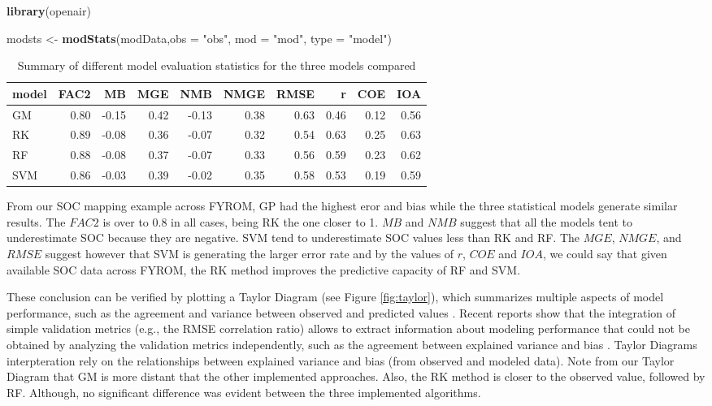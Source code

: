 \documentclass[10pt,b5paper,]{book}
\newenvironment{Shaded}{\begin{snugshade}}{\end{snugshade}}
\newcommand{\DataTypeTok}[1]{\textcolor[rgb]{0.13,0.29,0.53}{#1}}
\newcommand{\KeywordTok}[1]{\textcolor[rgb]{0.13,0.29,0.53}{\textbf{#1}}}
\newcommand{\NormalTok}[1]{#1}
\newcommand{\StringTok}[1]{\textcolor[rgb]{0.31,0.60,0.02}{#1}}
\theoremstyle{definition}
\theoremstyle{definition}
\theoremstyle{definition}
\theoremstyle{remark}
\begin{document}
\begin{Shaded}
\begin{Highlighting}[]
\KeywordTok{library}\NormalTok{(openair)}

\NormalTok{modsts <-}\StringTok{ }\KeywordTok{modStats}\NormalTok{(modData,}\DataTypeTok{obs =} \StringTok{"obs"}\NormalTok{, }\DataTypeTok{mod =} \StringTok{"mod"}\NormalTok{, }\DataTypeTok{type =} \StringTok{"model"}\NormalTok{)}
\end{Highlighting}
\end{Shaded}

\begin{table}

\caption{\label{tab:modsts}Summary of different model evaluation statistics for the three models compared}
\centering
\begin{tabular}[t]{lrrrrrrrrr}
\toprule
model & FAC2 & MB & MGE & NMB & NMGE & RMSE & r & COE & IOA\\
\midrule
GM & 0.80 & -0.15 & 0.42 & -0.13 & 0.38 & 0.63 & 0.46 & 0.12 & 0.56\\
RK & 0.89 & -0.08 & 0.36 & -0.07 & 0.32 & 0.54 & 0.63 & 0.25 & 0.63\\
RF & 0.88 & -0.08 & 0.37 & -0.07 & 0.33 & 0.56 & 0.59 & 0.23 & 0.62\\
SVM & 0.86 & -0.03 & 0.39 & -0.02 & 0.35 & 0.58 & 0.53 & 0.19 & 0.59\\
\bottomrule
\end{tabular}
\end{table}

From our SOC mapping example across FYROM, GP had the highest eror and
bias while the three statistical models generate similar results. The
\(FAC2\) is over to 0.8 in all cases, being RK the one closer to 1.
\(MB\) and \(NMB\) suggest that all the models tent to underestimate SOC
because they are negative. SVM tend to underestimate SOC values less
than RK and RF. The \(MGE\), \(NMGE\), and \(RMSE\) suggest however that
SVM is generating the larger error rate and by the values of \(r\),
\(COE\) and \(IOA\), we could say that given available SOC data across
FYROM, the RK method improves the predictive capacity of RF and SVM.

These conclusion can be verified by plotting a Taylor Diagram (see
Figure \ref{fig:taylor}), which summarizes multiple aspects of model
performance, such as the agreement and variance between observed and
predicted values \citep{taylor2001summarizing}. Recent reports show that
the integration of simple validation metrics (e.g., the RMSE correlation
ratio) allows to extract information about modeling performance that
could not be obtained by analyzing the validation metrics independently,
such as the agreement between explained variance and bias
\citep{guevara_2018, nussbaum2018evaluation}. Taylor Diagrams
interpteration rely on the relationships between explained variance and
bias (from observed and modeled data). Note from our Taylor Diagram that
GM is more distant that the other implemented approaches. Also, the RK
method is closer to the observed value, followed by RF. Although, no
significant difference was evident between the three implemented
algorithms.
\end{document}
